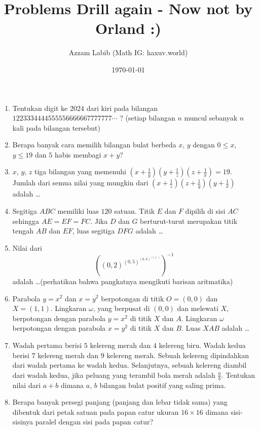 \documentclass[11pt]{scrartcl}
\title{Problems Drill again - Now not by Orland :)}
\author{Azzam Labib (Math IG: haxuv.world)}
\date{\today}
\begin{document}
\maketitle

\begin{enumerate}
    \item Tentukan digit ke 2024 dari kiri pada bilangan $1223334444555556666667777777\cdots$ ? (setiap bilangan $n$ muncul sebanyak $n$ kali pada bilangan tersebut)
    
    \item Berapa banyak cara memilih bilangan bulat berbeda $x$, $y$ dengan $0 \leq x$, $y \leq 19$ dan $5$ habis membagi $x + y$?
    
    \item $x$, $y$, $z$ tiga bilangan yang memenuhi $\left(x + \frac{1}{y}\right)\left(y + \frac{1}{z}\right)\left(z + \frac{1}{x}\right) = 19$. Jumlah dari semua nilai yang mungkin dari $\left(x + \frac{1}{z}\right)\left(z + \frac{1}{y}\right)\left(y + \frac{1}{x}\right)$ adalah \ldots
    
    \item Segitiga $ABC$ memiliki luas $120$ satuan. Titik $E$ dan $F$ dipilih di sisi $AC$ sehingga $AE = EF = FC$. Jika $D$ dan $G$ berturut-turut merupakan titik tengah $AB$ dan $EF$, luas segitiga $DFG$ adalah \ldots
    
    \item Nilai dari $$\left(\left(0,2\right)^{\left(0,5\right)^{(0,8)^{\left(1,1^{\dots}\right)}}}\right)^{-1}$$ adalah \ldots (perhatikan bahwa pangkatnya mengikuti barisan aritmatika)
    
    \item Parabola $y = x^2$ dan $x = y^2$ berpotongan di titik $O = (0, 0)$ dan $X = (1, 1)$. Lingkaran $\omega$, yang berpusat di $(0, 0)$ dan melewati $X$, berpotongan dengan parabola $y = x^2$ di titik $X$ dan $A$. Lingkaran $\omega$ berpotongan dengan parabola $x = y^2$ di titik $X$ dan $B$. Luas $XAB$ adalah \ldots
    
    \item Wadah pertama berisi $5$ kelereng merah dan $4$ kelereng biru. Wadah kedua berisi $7$ kelereng merah dan $9$ kelereng merah. Sebuah kelereng dipindahkan dari wadah pertama ke wadah kedua. Selanjutnya, sebuah kelereng diambil dari wadah kedua, jika peluang yang terambil bola merah adalah $\frac{a}{b}$. Tentukan nilai dari $a + b$ dimana $a$, $b$ bilangan bulat positif yang saling prima.

    \item Berapa banyak persegi panjang (panjang dan lebar tidak sama) yang dibentuk dari petak satuan pada papan catur ukuran $16 \times 16$ dimana sisi-sisinya paralel dengan sisi pada papan catur?
    

\end{enumerate}
\end{document}
